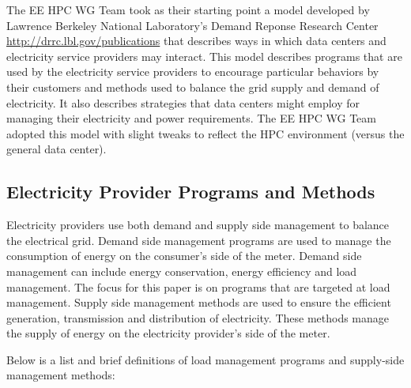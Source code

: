 
The EE HPC WG Team took as their starting point a model developed by
Lawrence Berkeley National Laboratory's Demand Reponse Research Center
\href{http://drrc.lbl.gov/publications/demand-response-and-open-automated-demand-response-opportunities-data-centers}
{http://drrc.lbl.gov/publications}
 that describes ways in which data centers and electricity service
providers may interact. This model describes programs that are used by the
electricity service providers to encourage particular behaviors by their
customers and methods used to balance the grid supply and demand of
electricity. It also describes strategies that data centers might employ for
managing their electricity and power requirements. The EE HPC WG Team
adopted this model with slight tweaks to reflect the HPC environment (versus
the general data center).

\subsection{Electricity Provider Programs and Methods}

Electricity providers use both demand and supply side management to balance the electrical grid.  Demand side management programs are used to manage the consumption of energy on the consumer’s side of the meter.  Demand side management can include energy conservation, energy efficiency and load management.  The focus for this paper is on programs that are targeted at load management. Supply side management methods are used to ensure the efficient generation, transmission and distribution of electricity.  These methods manage the supply of energy on the electricity provider’s side of the meter. 


Below is a list and brief definitions of load management programs and supply-side management methods:



